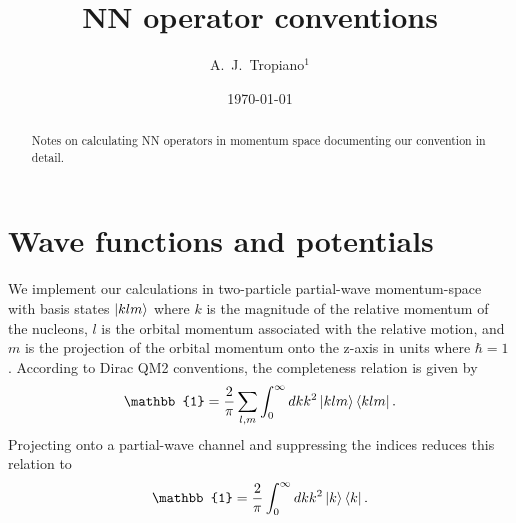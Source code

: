 \documentclass[preprintnumbers,floatfix,aps,prc,preprint,nofootinbib]{revtex4-1}
\begin{document}
\title{NN operator conventions}


\author{A.~J.~Tropiano$^{1}$}


\date{\today}

\begin{abstract}
Notes on calculating NN operators in momentum space documenting our convention in detail.
\end{abstract}

\maketitle

\newpage


\section{Wave functions and potentials}
\label{sec:wave_functions_potentials}


We implement our calculations in two-particle partial-wave momentum-space with basis states $\ket{klm}$ where $k$ is the magnitude of the relative momentum of the nucleons, $l$ is the orbital momentum associated with the relative motion, and $m$ is the projection of the orbital momentum onto the z-axis in units where $\hbar=1$.
According to Dirac QM2 conventions, the completeness relation is given by
%
\begin{eqnarray}
    \label{eq:completeness_relation}
    \mathbb{1} = \frac{2}{\pi} \sum_{l,m} \int_0^{\infty} dk k^2 \ket{klm} \bra{klm}.
\end{eqnarray}
%
Projecting onto a partial-wave channel and suppressing the indices reduces this relation to
%
\begin{eqnarray}
    \label{eq:completeness_relation_reduced}
    \mathbb{1} = \frac{2}{\pi} \int_0^{\infty} dk k^2 \ket{k} \bra{k}.
\end{eqnarray}
%
\end{document}
